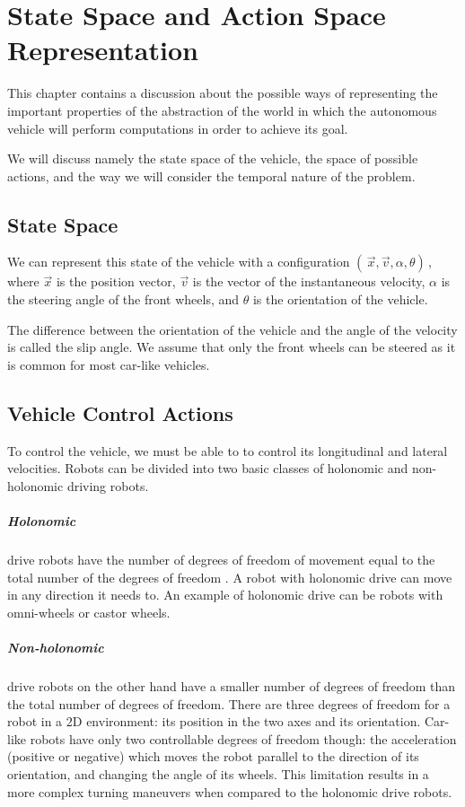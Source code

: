 \chapter{State Space and Action Space Representation}

This chapter contains a discussion about the possible ways of representing the important properties of the abstraction of the world in which the autonomous vehicle will perform computations in order to achieve its goal.

We will discuss namely the state space of the vehicle, the space of possible actions, and the way we will consider the temporal nature of the problem.

\section{State Space}

We can represent this state of the vehicle with a configuration $( \, \vec{x}, \vec{v}, \alpha, \theta ) \,$, where $\vec{x}$ is the position vector, $\vec{v}$ is the vector of the instantaneous velocity, $\alpha$ is the steering angle of the front wheels, and $\theta$ is the orientation of the vehicle.

The difference between the orientation of the vehicle and the angle of the velocity is called the slip angle. We assume that only the front wheels can be steered as it is common for most car-like vehicles.

\section{Vehicle Control Actions}

To control the vehicle, we must be able to to control its longitudinal and lateral velocities. Robots can be divided into two basic classes of holonomic and non-holonomic driving robots.

\paragraph{Holonomic} drive robots have the number of degrees of freedom of movement equal to the total number of the degrees of freedom \cite{}. A robot with holonomic drive can move in any direction it needs to. An example of holonomic drive can be robots with omni-wheels or castor wheels.

\paragraph{Non-holonomic} drive robots on the other hand have a smaller number of degrees of freedom than the total number of degrees of freedom. There are three degrees of freedom for a robot in a 2D environment: its position in the two axes and its orientation. Car-like robots have only two controllable degrees of freedom though: the acceleration (positive or negative) which moves the robot parallel to the direction of its orientation, and changing the angle of its wheels. This limitation results in a more complex turning maneuvers when compared to the holonomic drive robots.

